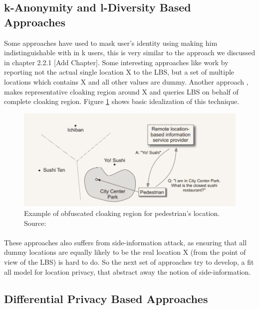 \documentclass[12pt]{report}
\begin{document}
\subsection{k-Anonymity and l-Diversity Based Approaches}
Some approaches have used to mask user's identity using making him indistinguishable with in k users, this is very similar to the approach we discussed in chapter 2.2.1 [Add Chapter]. Some interesting approaches like \cite{kido2005protection} work by reporting not the actual single location X to the LBS, but a set of multiple locations which contains X and all other values are dummy. Another approach \cite{duckham2005formal}, makes representative cloaking region around X and queries LBS on behalf of complete cloaking region. Figure \ref{fig:obfuscationRegion} shows basic idealization of this technique.


\begin{figure}[ht]
\centering
        \includegraphics[width=120mm,scale=1]{Images/obfuscationRegion.PNG}
    \caption{Example of obfuscated cloaking region for pedestrian's location. Source:\cite{duckham2005formal}}
    \label{fig:obfuscationRegion}
\end{figure}

\paragraph{}
These approaches also suffers from side-information attack, as ensuring that all dummy locations are equally likely to be the real location X (from the point of view of the LBS) is hard to do. So the next set of approaches try to develop, a fit all model for location privacy, that abstract away the notion of side-information.



\subsection{Differential Privacy Based Approaches}
\end{document}

